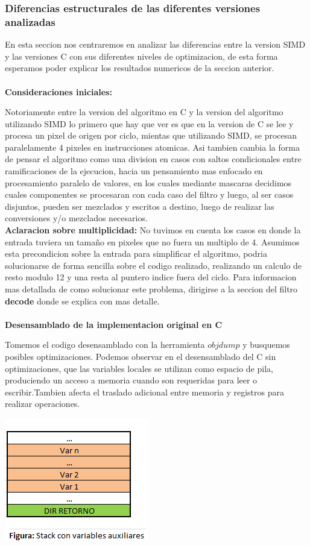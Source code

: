 \subsubsection{Diferencias estructurales de las diferentes versiones analizadas}

En esta seccion nos centraremos en analizar las diferencias entre la version SIMD y las versiones C con sus diferentes niveles de optimizacion, de esta forma esperamos poder explicar los resultados numericos de la seccion anterior.
\\
\\
\textbf{Consideraciones iniciales:}\\
\par
Notoriamente entre la version del algoritmo en C y la version del algoritmo utilizando SIMD lo primero que hay que ver es que en la version de C se lee y procesa un pixel de origen por ciclo, mientas que utilizando SIMD, se procesan paralelamente 4 pixeles en instrucciones atomicas. Asi tambien cambia la forma de pensar el algoritmo como una division en casos con saltos condicionales entre ramificaciones de la ejecucion, hacia un pensamiento mas enfocado en procesamiento paralelo de valores, en los cuales mediante mascaras decidimos cuales componentes se procesaran con cada caso del filtro y luego, al ser casos disjuntos, pueden ser mezclados y escritos a destino, luego de realizar las conversiones y/o mezclados necesarios. 
\\
\textbf{Aclaracion sobre multiplicidad:} No tuvimos en cuenta los casos en donde la entrada tuviera un tamaño en pixeles que no fuera un multiplo de 4. Asumimos esta precondicion sobre la entrada para simplificar el algoritmo, podria solucionarse de forma sencilla sobre el codigo realizado, realizando un calculo de resto modulo 12 y una resta al puntero indice fuera del ciclo. Para informacion mas detallada de como solucionar este problema, dirigirse a la seccion del filtro \textbf{decode} donde se explica con mas detalle.
\\
\\
\textbf{Desensamblado de la implementacion original en C}\\
\par
Tomemos el codigo desensamblado con la herramienta \textbf{$objdump$} y busquemos posibles optimizaciones.
Podemos observar en el desensamblado del C sin optimizaciones, que las variables locales se utilizan como espacio de pila, produciendo un acceso a memoria cuando son requeridas para leer o escribir.Tambien afecta el traslado adicional entre memoria y registros para realizar operaciones.
\begin{center}
  \includegraphics[scale=1]{imagenes/var-stack.png} 
\end{center}

